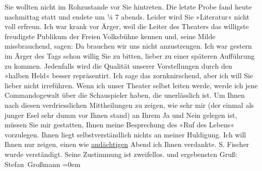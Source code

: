 \begin{ledgroupsized}[t]{13cm}
               Sie wollten nicht im Rohzustande vor Sie hintreten.\pend
           \pstart
           Die letzte Probe fand heute nachmittag statt und endete um ¼ 7
               abends.\pend
           \pstart
           Leider wird Sie »Literatur« nicht voll erfreun. Ich
               war krank vor Ärger, weil die Leiter des Theaters das willigste  freudigste Publikum der Freien Volksbühne kennen und, seine Milde missbrauchend, sagen: Da brauchen
               wir uns nicht anzustrengen.\pend
           \pstart
           {\pb}Ich war gestern im Ärger des Tags schon
               willig Sie zu bitten, lieber zu einer späteren Aufführung zu kommen. Jedenfalls wird
               die Qualität unserer Vorstellungen durch den »halben
                  Held« besser repräsentirt.\pend
           \pstart
           Ich sage das zornknirschend, aber ich will Sie lieber nicht irreführen. Wenn ich
               unser Theater selbst leiten werde, werde ich jene {\pb}Commandogewalt über die Schauspieler haben,
               die unerlässlich ist.\pend
           \pstart
           Um Ihnen nach diesen verdriesslichen Mittheilungen zu zeigen, wie sehr mir (der
               einmal als junger Esel sehr dumm vor Ihnen stand) an Ihrem Ja und Nein gelegen ist,
               müssen Sie mir gestatten, Ihnen meine Besprechung des »Ruf des Lebens«
               vorzulegen. Ihnen liegt selbstverständlich nichts an {\pb}meiner Huldigung. Ich will Ihnen nur zeigen,
               einen wie \uline{andächtigen} Abend ich Ihnen verdankte.\pend
           \pstart
           S. Fischer wurde verständigt. Seine Zustimmung
               ist zweifellos.\pend
           \pstart
            und ergebensten Gruß:{\\[\baselineskip]}\spacefill\mbox{Stefan
                  Großmann}\pend
           \leftskip=0em{}\endnumbering{}\end{ledgroupsized}  \newcommand{\dateiname}{L01921}\newcommand{\titel}{Stefan Großmann an Arthur Schnitzler, 2. 4. 1910}\newcommand{\editorInnen}{ Martin Anton Müller und Gerd-Hermann Susen}
      